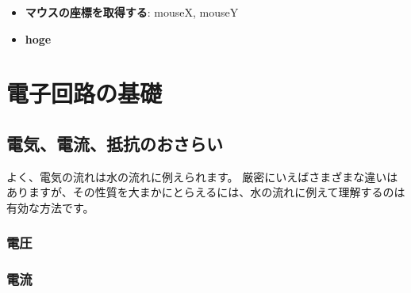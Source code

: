 \documentclass[11pt,a4paper]{jarticle}
\begin{document}
\begin{itemize}
 \item \textbf{マウスの座標を取得する}: mouseX, mouseY
 \item \textbf{hoge}
\end{itemize}





\section{電子回路の基礎}

\subsection*{電気、電流、抵抗のおさらい}
よく、電気の流れは水の流れに例えられます。
厳密にいえばさまざまな違いはありますが、その性質を大まかにとらえるには、水の流れに例えて理解するのは有効な方法です。

\subsubsection*{電圧}

\subsubsection*{電流}
\end{document}
